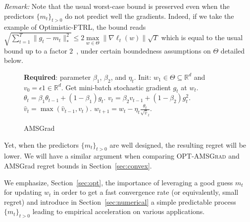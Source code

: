 \documentclass[wcp]{jmlr}
\begin{document}
\textit{Remark:} Note that the usual worst-case bound is preserved even when the predictors $\{m_{t}\}_{t>0}$ do not predict well the gradients. Indeed, if we take the example of Optimistic-FTRL, the bound reads $\sqrt{\sum_{t=1}^T \| g_t - m_t \|_*^2 } \leq 2 \max \limits_{w \in \Theta} \| \nabla \ell_t(w) \| \sqrt{T}$ which is equal to the usual bound up to a factor $2$~\citep{RS13b}, under certain boundedness assumptions on $\Theta$ detailed below.
\begin{figure}\vspace{-0.8cm}
\begin{minipage}{\linewidth}
\begin{algorithm}[H]
\caption{AMSGrad \citep{RKK18}} \label{alg:amsgrad}
\begin{algorithmic}[1]
\small
\STATE \textbf{Required}: parameter $\beta_1$, $\beta_2$, and $\eta_t$. 
\STATE Init: $w_{1} \in \Theta \subseteq \mathbb R^d $ and $v_{0} = \epsilon 1 \in \mathbb R^{d}$.
\STATE Get mini-batch stochastic gradient $g_t$ at $w_t$.
\STATE $\theta_t = \beta_1 \theta_{t-1} + (1 - \beta_1) g_t$.
\STATE $v_t = \beta_2 v_{t-1} + (1 - \beta_2) g_t^2$. 
\STATE \label{line:maxop}$\hat{v}_t = \max( \hat{v}_{t-1} , v_t )$. 
\STATE $w_{t+1} = w_t - \eta_t \frac{\theta_t}{ \sqrt{\hat{v}}_t }$.
\ENDFOR
\end{algorithmic}
\end{algorithm}
\vspace{-0.1in}
\end{minipage}\end{figure}
Yet, when the predictors $\{m_{t}\}_{t>0}$ are well designed, the resulting regret will be lower. 
We will have a similar argument when comparing \textsc{OPT-AMSGrad} and AMSGrad regret bounds in Section~\ref{sec:convex}.

We emphasize, Section~\ref{sec:opt}, the importance of leveraging a good guess $m_t$ for updating $w_t$ in order to get a fast convergence rate (or equivalently, small regret) and introduce in Section~\ref{sec:numerical} a simple predictable process $\{m_{t}\}_{t>0}$ leading to empirical acceleration on various applications.
\end{document}
